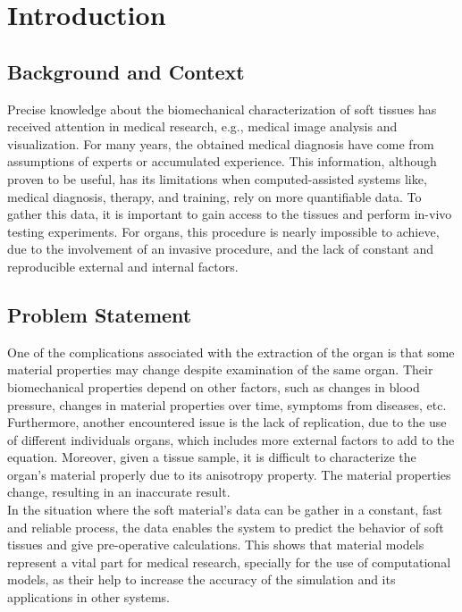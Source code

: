 
\chapter{Introduction} %

\label{Chapter2} %

\section{Background and Context}

Precise knowledge about the biomechanical characterization of soft tissues has received attention
in medical research, e.g., medical image analysis and visualization.
For many years, the obtained medical diagnosis have come from assumptions of experts or 
accumulated experience. This information, although proven to be useful, has its limitations 
when computed-assisted systems like, medical diagnosis, therapy, and training, rely on 
more quantifiable data\cite{Kauer2002}. To gather this data, it is important to gain access
to the tissues and perform in-vivo testing experiments. For organs, this procedure is nearly 
impossible to achieve, due to the involvement of an invasive procedure, and the lack of constant
and reproducible external and internal factors. \\ 

\section{Problem Statement}
One of the complications associated with the extraction of the organ is that some material 
properties may change despite examination of the same organ. Their biomechanical properties 
depend on other factors, such as changes in blood pressure, changes in material properties 
over time, symptoms from diseases, etc. Furthermore, another encountered issue is the lack 
of replication, due to the use of different individuals organs, which includes more external
 factors to add to the equation. Moreover, given a tissue sample, it is difficult to 
 characterize the organ's material properly due to its anisotropy property. The material 
 properties change, resulting in an inaccurate result.
\\

In the situation where the soft material's data can be gather in a constant, fast and reliable
process, the data enables the system to predict the behavior of soft tissues and give pre-operative
 calculations. This shows that material models represent a vital part for medical research, 
 specially for the use of computational models, as their help to increase the accuracy of the 
 simulation and its applications in other systems. 

